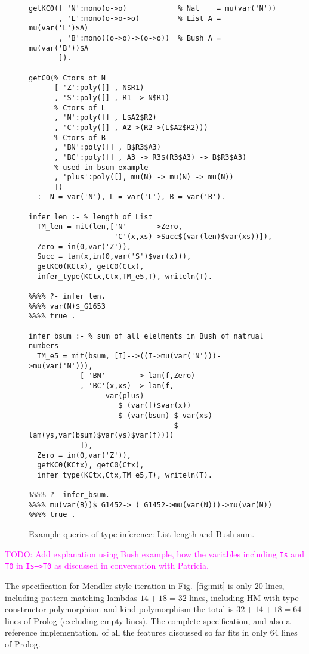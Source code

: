 \documentclass[runningheads,a4paper]{llncs}
\newcommand{\TODO}[1]{\textcolor{magenta}{TODO: #1}}
\begin{document}
\begin{figure}\small
\begin{verbatim}
getKC0([ 'N':mono(o->o)            % Nat    = mu(var('N'))
       , 'L':mono(o->o->o)         % List A = mu(var('L')$A)
       , 'B':mono((o->o)->(o->o))  % Bush A = mu(var('B'))$A
       ]).

getC0(% Ctors of N
      [ 'Z':poly([] , N$R1)
      , 'S':poly([] , R1 -> N$R1)
      % Ctors of L
      , 'N':poly([] , L$A2$R2)
      , 'C':poly([] , A2->(R2->(L$A2$R2)))
      % Ctors of B
      , 'BN':poly([] , B$R3$A3)
      , 'BC':poly([] , A3 -> R3$(R3$A3) -> B$R3$A3)
      % used in bsum example
      , 'plus':poly([], mu(N) -> mu(N) -> mu(N))
      ])
  :- N = var('N'), L = var('L'), B = var('B').

infer_len :- % length of List
  TM_len = mit(len,['N'      ->Zero,
                    'C'(x,xs)->Succ$(var(len)$var(xs))]),
  Zero = in(0,var('Z')),
  Succ = lam(x,in(0,var('S')$var(x))),
  getKC0(KCtx), getC0(Ctx),
  infer_type(KCtx,Ctx,TM_e5,T), writeln(T).

%%%% ?- infer_len.
%%%% var(N)$_G1653
%%%% true .

infer_bsum :- % sum of all elelments in Bush of natrual numbers
  TM_e5 = mit(bsum, [I]-->((I->mu(var('N')))->mu(var('N'))),
            [ 'BN'       -> lam(f,Zero)
            , 'BC'(x,xs) -> lam(f,
                  var(plus)
                     $ (var(f)$var(x))
                     $ (var(bsum) $ var(xs)
                                  $ lam(ys,var(bsum)$var(ys)$var(f))))
            ]),
  Zero = in(0,var('Z')),
  getKC0(KCtx), getC0(Ctx),
  infer_type(KCtx,Ctx,TM_e5,T), writeln(T).

%%%% ?- infer_bsum.
%%%% mu(var(B))$_G1452-> (_G1452->mu(var(N)))->mu(var(N))
%%%% true .
\end{verbatim}
\caption{Example queries of type inference: List length and Bush sum.}
\label{fig:TIexample}
\end{figure}
\TODO{Add explanation using Bush example, how the variables including
  \texttt{Is} and \texttt{T0} in \texttt{Is-->T0} as discussed in conversation
  with Patricia.}


The specification for Mendler-style iteration in Fig.~\ref{fig:mit}
is only 20 lines, including pattern-matching lambdas $14+18=32$ lines,
including HM with type constructor polymorphism and kind polymorphism
the total is $32+14+18=64$ lines of Prolog (excluding empty lines).
The complete specification, and also a reference implementation, of
all the features discussed so far fits in only 64 lines of Prolog.
\end{document}
